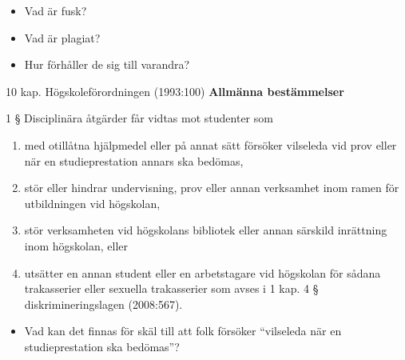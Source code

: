 \mode*

\begin{frame}
  \begin{question}[10 min]
    \begin{itemize}
      \item Vad är fusk?
      \item Vad är plagiat?
      \item Hur förhåller de sig till varandra?
    \end{itemize}
  \end{question}
\end{frame}

\begin{frame}
  \begin{block}{10 kap. Högskoleförordningen (1993:100)\nocite{SFS1993:100}}
    \textbf{Allmänna bestämmelser}

    \vspace{0.5em}
    1 §   Disciplinära åtgärder får vidtas mot studenter som
    \begin{enumerate}
      \item \alert<2>{med otillåtna hjälpmedel eller på annat sätt försöker 
        vilseleda vid prov eller när en studieprestation annars ska bedömas,}
      \item stör eller hindrar undervisning, prov eller annan verksamhet inom 
        ramen för utbildningen vid högskolan,
      \item stör verksamheten vid högskolans bibliotek eller annan särskild 
        inrättning inom högskolan, eller
      \item utsätter en annan student eller en arbetstagare vid högskolan för 
        sådana trakasserier eller sexuella trakasserier som avses i 1 kap. 4 § 
        diskrimineringslagen (2008:567).
    \end{enumerate}
  \end{block}
\end{frame}

\begin{frame}
  \begin{question}[10 min]
    \begin{itemize}
      \item Vad kan det finnas för skäl till att folk försöker 
        \enquote{vilseleda när en studieprestation ska bedömas}?
    \end{itemize}
  \end{question}
\end{frame}

